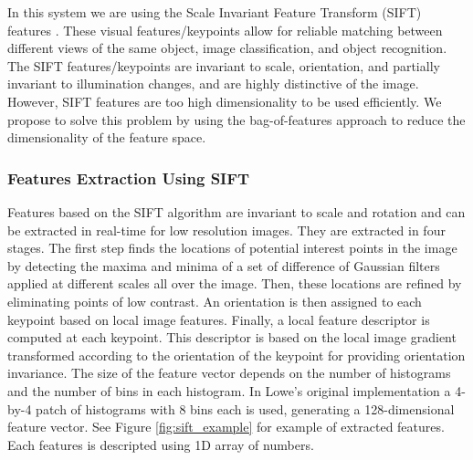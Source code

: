 \documentclass[12pt,fleqn]{book} %
\begin{document}
In this system we are using the Scale Invariant Feature Transform (SIFT) features \cite{sift}. These visual features/keypoints allow for reliable matching between different views of the same object, image classification, and object recognition. The SIFT features/keypoints are invariant to scale, orientation, and partially invariant to illumination changes, and are highly distinctive of the image. However, SIFT features are too high dimensionality to be used efficiently. We propose to solve this problem by using the bag-of-features approach \cite{Lazebn06} to reduce the
dimensionality of the feature space. \bigskip


\subsubsection{Features Extraction Using SIFT} 
Features based on the SIFT algorithm are invariant to scale and rotation and can be 
extracted in real-time for low resolution images. They are extracted in four stages. The first step 
finds the locations of potential interest points in the image by detecting the maxima and minima 
of a set of difference of Gaussian filters applied at different scales all over the image. Then, these 
locations are refined by eliminating points of low contrast. An orientation is then assigned to 
each keypoint based on local image features. Finally, a local feature descriptor is computed at 
each keypoint. This descriptor is based on the local image gradient transformed according to the 
orientation of the keypoint for providing orientation invariance. The size of the feature vector 
depends on the number of histograms and the number of bins in each histogram. In Lowe’s 
original implementation\cite{sift} a 4-by-4 patch of histograms with 8 bins each is used, 
generating a 128-dimensional feature vector. See Figure \ref{fig:sift_example} for example of extracted features. Each features is descripted using 1D array of numbers. 
\end{document}

